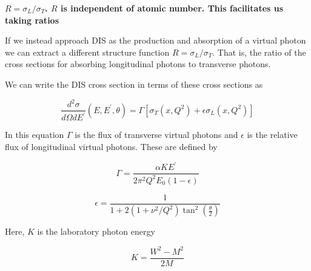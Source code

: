 \textbf{$R=\sigma_L/\sigma_T$. $R$ is independent of atomic number. This facilitates us taking ratios}

If we instead approach DIS as the production and absorption of a virtual photon we can extract a different structure function $R=\sigma_L/\sigma_T$. That is, the ratio of the cross sections for absorbing longitudinal photons to transverse photons.

We can write the DIS cross section in terms of these cross sections as

\begin{equation}
	\frac{d^2\sigma}{d\Omega dE^\prime}\left(E,E^\prime,\theta\right) = \Gamma\left[\sigma_T\left(x,Q^2\right)+\epsilon\sigma_L\left(x,Q^2\right)\right]
\end{equation}

In this equation $\Gamma$ is the flux of transverse virtual photons and $\epsilon$ is the relative flux of longitudinal virtual photons. These are defined by

\begin{equation}
	\Gamma = \frac{\alpha KE^\prime}{2\pi^2Q^2E_0\left(1-\epsilon\right)}
\end{equation}

\begin{equation}
	\epsilon = \frac{1}{1+2\left(1+\nu^2/Q^2\right)\tan^2\left(\frac{\theta}{2}\right)}
\end{equation}

Here, $K$ is the laboratory photon energy

\begin{equation}
	K = \frac{W^2-M^2}{2M}
\end{equation}